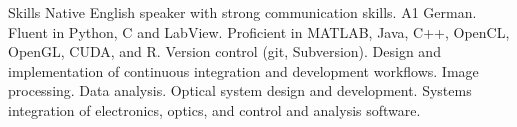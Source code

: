 
\begin{rubric}{Skills}
\entry*[Languages]
	Native English speaker with strong communication skills. A1 German.
	Fluent in Python, C and LabView. Proficient in MATLAB, Java, C++, OpenCL, OpenGL, CUDA, and R.
\entry*[Development]
	Version control (git, Subversion). Design and implementation of continuous integration and development workflows. 
\entry*[Engineering]
    Image processing. Data analysis. Optical system design and development. Systems integration of electronics, optics, and control and analysis software.
\end{rubric}
